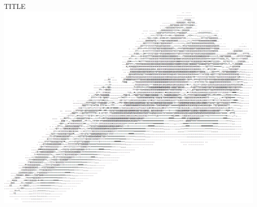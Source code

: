 \thispagestyle{empty}
\begin{center}
  \Huge
	TITLE
	\vspace*{1.5in}~\\
  \hspace*{-1in}
    \includegraphics[scale=0.60]{Figures/FrontPage/FrontPage.png}
			
\end{center}



